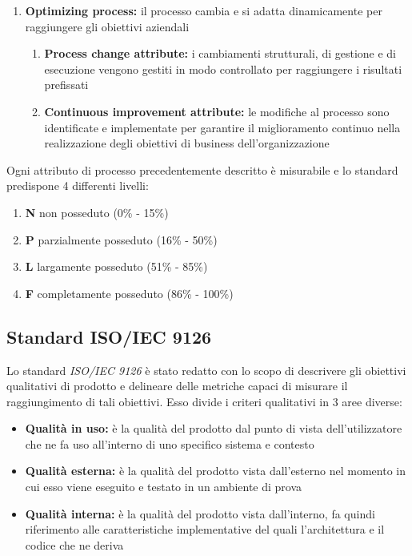 \documentclass[12pt,a4paper]{article}
\begin{document}
\begin{enumerate}
		\item\textbf{Optimizing process:} il processo cambia e si adatta dinamicamente per raggiungere gli obiettivi aziendali
		\begin{enumerate}
			\item \textbf{Process change attribute:} i cambiamenti strutturali, di gestione e di esecuzione vengono gestiti in modo controllato per raggiungere i risultati prefissati
			\item \textbf{Continuous improvement attribute:} le modifiche al processo sono identificate e implementate per garantire il miglioramento continuo nella realizzazione degli obiettivi di business dell'organizzazione
		\end{enumerate}
	\end{enumerate}
	
	Ogni attributo di processo precedentemente descritto è misurabile e lo standard predispone 4 differenti livelli:
	
	\begin{enumerate}
		\item \textbf{N} non posseduto (0\% - 15\%)
		\item \textbf{P} parzialmente posseduto (16\% - 50\%)
		\item \textbf{L} largamente posseduto (51\% - 85\%)
		\item \textbf{F} completamente posseduto (86\% - 100\%)
	\end{enumerate}
	
	\subsection{Standard ISO/IEC 9126}
	Lo standard \textit{ISO/IEC 9126} è stato redatto con lo scopo di descrivere gli obiettivi qualitativi di prodotto e delineare delle metriche capaci di misurare il raggiungimento di tali obiettivi. Esso divide i criteri qualitativi in 3 aree diverse:
	
	\begin{itemize}
		\item \textbf{Qualità in uso:} è la qualità del prodotto  dal punto di vista dell'utilizzatore che ne fa uso all'interno di uno specifico sistema e contesto
		\item \textbf{Qualità esterna:} è la qualità del prodotto  vista dall'esterno nel momento in cui esso viene eseguito e testato in un ambiente di prova
		\item \textbf{Qualità interna:} è la qualità del prodotto  vista dall'interno, fa quindi riferimento alle caratteristiche implementative del  quali l'architettura e il codice che ne deriva
	\end{itemize}
	
\end{document}
